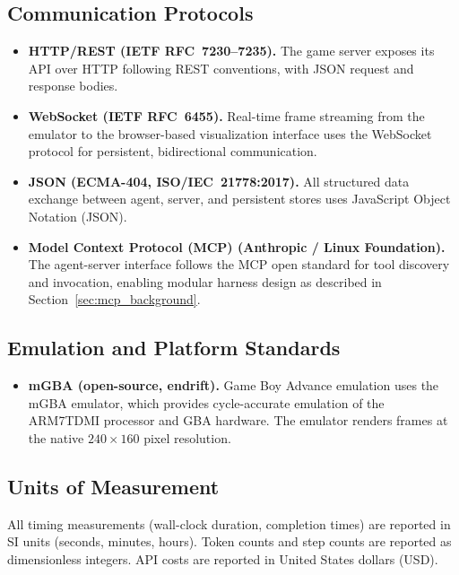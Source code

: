 \subsection{Communication Protocols}

\begin{itemize}[nosep]
\item \textbf{HTTP/REST (IETF RFC~7230--7235).} The game server exposes its API over HTTP following REST conventions, with JSON request and response bodies.
\item \textbf{WebSocket (IETF RFC~6455).} Real-time frame streaming from the emulator to the browser-based visualization interface uses the WebSocket protocol for persistent, bidirectional communication.
\item \textbf{JSON (ECMA-404, ISO/IEC~21778:2017).} All structured data exchange between agent, server, and persistent stores uses JavaScript Object Notation (JSON).
\item \textbf{Model Context Protocol (MCP) (Anthropic / Linux Foundation).} The agent-server interface follows the MCP open standard for tool discovery and invocation, enabling modular harness design as described in Section~\ref{sec:mcp_background}.
\end{itemize}

\subsection{Emulation and Platform Standards}

\begin{itemize}[nosep]
\item \textbf{mGBA (open-source, endrift).} Game Boy Advance emulation uses the mGBA emulator, which provides cycle-accurate emulation of the ARM7TDMI processor and GBA hardware. The emulator renders frames at the native $240 \times 160$ pixel resolution.
\end{itemize}

\subsection{Units of Measurement}

All timing measurements (wall-clock duration, completion times) are reported in SI units (seconds, minutes, hours). Token counts and step counts are reported as dimensionless integers. API costs are reported in United States dollars (USD).

